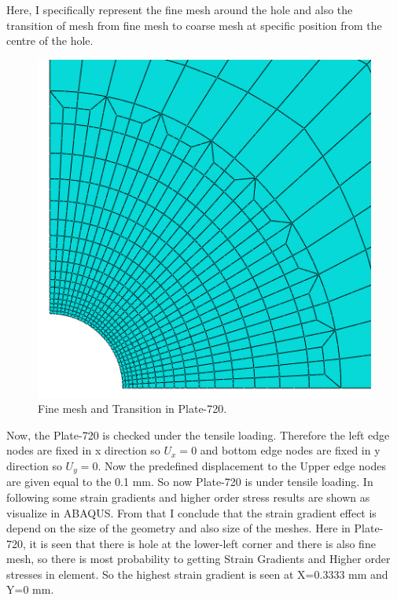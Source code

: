 \documentclass[12pt]{article}
\begin{document}
Here, I specifically represent the fine mesh around the hole and also the transition of mesh from fine mesh to coarse mesh at specific position from the centre of the hole.
\begin{figure}[H]
	\begin{center}
		\includegraphics[scale=0.38]{fine_mesh_part.png} 
	\end{center} 
   \caption{Fine mesh and Transition in Plate-720.} 
\end{figure}
Now, the Plate-720 is checked under the tensile loading. Therefore the left edge nodes are fixed in x direction so $U_x = 0$ and bottom edge nodes are fixed in y direction so $U_y = 0$. Now the predefined displacement to the Upper edge nodes are given equal to the 0.1 mm. So now Plate-720 is under tensile loading. In following some strain gradients and higher order stress results are shown as visualize in ABAQUS. From that I conclude that the strain gradient effect is depend on the size of the geometry and also size of the meshes. Here in Plate-720, it is seen that there is hole at the lower-left corner and there is also fine mesh, so there is most probability to getting Strain Gradients and Higher order stresses in element. So the highest strain gradient is seen at X=0.3333 mm and Y=0 mm.
\vspace{3cm} 
\end{document}
